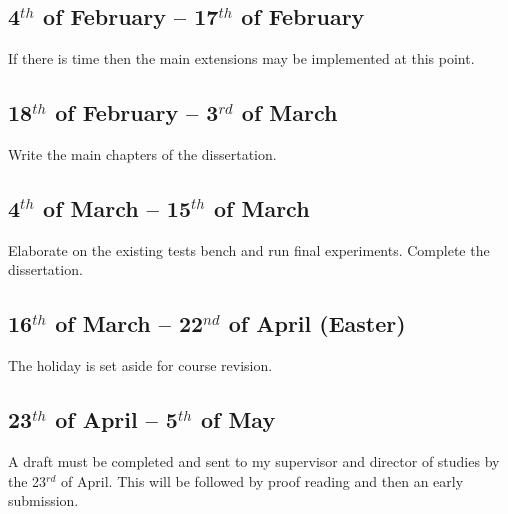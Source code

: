 \subsection*{4$^{th}$ of February -- 17$^{th}$ of February} If there is time then 
the main extensions may be implemented at this point.

\subsection*{18$^{th}$ of February -- 3$^{rd}$ of March} Write the main 
chapters of the dissertation.

\subsection*{4$^{th}$ of March -- 15$^{th}$ of March} Elaborate on the existing 
tests bench and run final experiments.  Complete the dissertation.

\subsection*{16$^{th}$ of March -- 22$^{nd}$ of April (Easter)} The holiday is 
set aside for course revision.

\subsection*{23$^{th}$ of April -- 5$^{th}$ of May} A draft must be completed 
and sent to my supervisor and director of studies by the 23$^{rd}$ of April.  
This will be followed by proof reading and then an early submission.  



